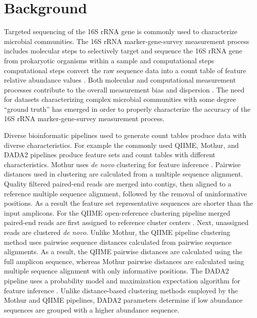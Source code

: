 \documentclass{bmcart}
\begin{document}
\section*{Background}

Targeted sequencing of the 16S rRNA gene is commonly used to characterize
microbial communities. The 16S rRNA marker-gene-survey
measurement process includes molecular steps to selectively target and sequence the 16S rRNA
gene from prokaryotic organisms within a sample and
computational steps \cite{Goodrich2014} computational steps
convert the raw sequence data into a count table of feature relative abundance values
\cite{Goodrich2014}. Both molecular and computational measurement
processes contribute to the overall measurement bias and dispersion
\cite{Amore2016, Goodrich2014, brooks2015truth}. The need for datasets characterizing complex microbial communities with
some degree ``ground truth'' has emerged in order to properly characterize the accuracy of the 16S rRNA
marker-gene-survey measurement process.

Diverse bioinformatic pipelines used to generate count tables produce data with diverse characteristics.
For example the commonly used QIIME, Mothur, and
DADA2 pipelines produce feature sets and count tables with different characteristics. 
Mothur uses \emph{de novo} clustering for feature
inference \cite{westcott2017opticlust, schloss2009introducing}.
Pairwise distances used in clustering are calculated from a multiple
sequence alignment. Quality filtered paired-end reads are merged
into contigs, then aligned to a reference multiple
sequence alignment, followed by the removal of uninformative positions.
As a result the feature set representative sequences are shorter than the input amplicons. 
For the QIIME open-reference clustering pipeline merged paired-end reads are first assigned to reference cluster
centers \cite{Rideout2014, Caporaso2010}. 
Next, unassigned reads are clustered \emph{de novo}. 
Unlike Mothur, the QIIME pipeline clustering method uses pairwise sequence distances calculated from pairwise sequence alignments. 
As a result, the QIIME pairwise distances are calculated using the full amplicon sequence, 
whereas Mothur pairwise distances are calculated using multiple sequence alignment with only informative positions.
The DADA2 pipeline uses a probability model and maximization expectation algorithm for feature inference \cite{callahan2016dada2}. 
Unlike distance-based clustering methods employed by the Mothur and QIIME pipelines, 
DADA2 parameters determine if low abundance sequences are grouped with a higher abundance sequence.
\end{document}

